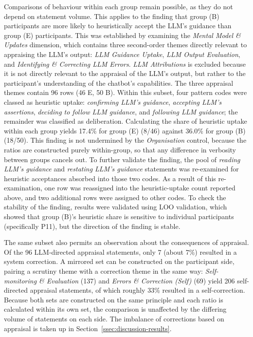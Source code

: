 Comparisons of behaviour within each group remain possible, as they do not depend on statement volume. This applies to the finding that group (B) participants are more likely to heuristically accept the \ac{LLM}'s guidance than group (E) participants. This was established by examining the \textit{Mental Model \& Updates} dimension, which contains three second-order themes directly relevant to appraising the \ac{LLM}'s output: \textit{LLM Guidance Uptake}, \textit{LLM Output Evaluation}, and \textit{Identifying \& Correcting LLM Errors}. \textit{LLM Attributions} is excluded because it is not directly relevant to the appraisal of the \ac{LLM}'s output, but rather to the participant's understanding of the chatbot's capabilities. The three appraisal themes contain 96 rows (46 E, 50 B). Within this subset, four pattern codes were classed as heuristic uptake: \textit{confirming LLM's guidance}, \textit{accepting LLM's assertions}, \textit{deciding to follow LLM guidance}, and \textit{following LLM guidance}; the remainder was classified as deliberation. Calculating the share of heuristic uptake within each group yields 17.4\% for group (E) (8/46) against 36.0\% for group (B) (18/50). This finding is not undermined by the \textit{Organisation} control, because the ratios are constructed purely within-group, so that any difference in verbosity between groups cancels out. To further validate the finding, the pool of \textit{reading LLM's guidance} and \textit{restating LLM's guidance} statements was re-examined for heuristic acceptances absorbed into those two codes. As a result of this re-examination, one row was reassigned into the heuristic-uptake count reported above, and two additional rows were assigned to other codes. To check the stability of the finding, results were validated using \ac{LOO} validation, which showed that group (B)'s heuristic share is sensitive to individual participants (specifically P11), but the direction of the finding is stable.

The same subset also permits an observation about the consequences of appraisal. Of the 96 \ac{LLM}-directed appraisal statements, only 7 (about 7\%) resulted in a system correction. A mirrored set can be constructed on the participant side, pairing a scrutiny theme with a correction theme in the same way: \textit{Self-monitoring \& Evaluation} (137) and \textit{Errors \& Correction (Self)} (69) yield 206 self-directed appraisal statements, of which roughly 33\% resulted in a self-correction. Because both sets are constructed on the same principle and each ratio is calculated within its own set, the comparison is unaffected by the differing volume of statements on each side. The imbalance of corrections based on appraisal is taken up in Section~\ref{ssec:discussion-results}.

